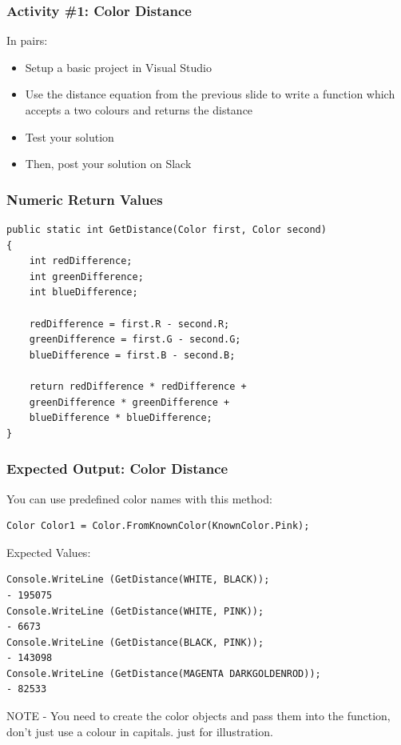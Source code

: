 \begin{frame}
	\frametitle{Activity \#1: Color Distance}
	
	In pairs:
	
	\vspace{2em}
	
	\begin{itemize}		
		\item Setup a basic project in Visual Studio
		\item Use the distance equation from the previous slide to write a function which accepts a two colours and returns the distance
		\item Test your solution
		\item Then, post your solution on Slack
	\end{itemize}
\end{frame}

\begin{frame}[fragile]
	\frametitle{Numeric Return Values}
	
\begin{lstlisting}
public static int GetDistance(Color first, Color second)
{
	int redDifference;
	int greenDifference;
	int blueDifference;

	redDifference = first.R - second.R;
	greenDifference = first.G - second.G;
	blueDifference = first.B - second.B;

	return redDifference * redDifference + 
	greenDifference * greenDifference +
	blueDifference * blueDifference;
}
\end{lstlisting}


\end{frame}

\begin{frame}[fragile]
	\frametitle{Expected Output: Color Distance}
 You can use predefined color names with this method:
\begin{lstlisting}
Color Color1 = Color.FromKnownColor(KnownColor.Pink);	
\end{lstlisting}
Expected Values:	
\begin{lstlisting}
Console.WriteLine (GetDistance(WHITE, BLACK));
- 195075
Console.WriteLine (GetDistance(WHITE, PINK));
- 6673
Console.WriteLine (GetDistance(BLACK, PINK));
- 143098
Console.WriteLine (GetDistance(MAGENTA DARKGOLDENROD));
- 82533
\end{lstlisting}
NOTE - You need to create the color objects and pass them into the function, don't just use a colour in capitals. just for illustration.  
\end{frame}

